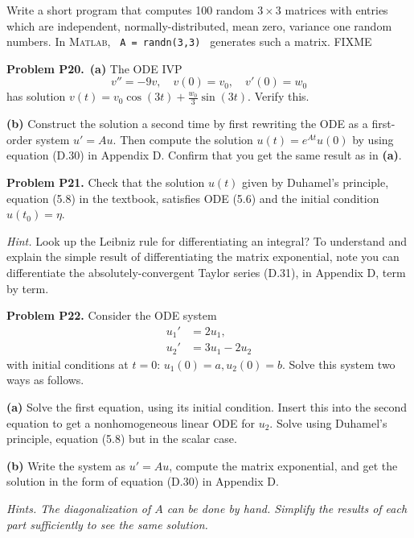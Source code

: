 \documentclass[12pt]{amsart}
\newcommand{\Matlab}{\textsc{Matlab}\xspace}
\newcommand{\prob}[1]{\bigskip\noindent\textbf{#1}\quad }
\newcommand{\epart}[1]{\medskip\noindent\textbf{(#1)}\quad }
\newcommand{\ppart}[1]{\,\textbf{(#1)}\quad }
\begin{document}
\medskip \noindent
Write a short program that computes 100 random $3\times 3$ matrices with entries which are independent, normally-distributed, mean zero, variance one random numbers.  In \Matlab, \verb| A = randn(3,3) | generates such a matrix.  FIXME


\prob{Problem P20.}  \ppart{a} The ODE IVP
    $$v'' = - 9 v, \quad v(0) = v_0, \quad v'(0) = w_0$$
has solution $v(t) = v_0 \cos(3 t) + \frac{w_0}{3} \sin(3t)$.  Verify this.

\epart{b}  Construct the solution a second time by first rewriting the ODE as a first-order system $u' = A u$.  Then compute the solution $u(t) = e^{At} u(0)$ by using equation (D.30) in Appendix D.  Confirm that you get the same result as in \textbf{(a)}.


\prob{Problem P21.}  Check that the solution $u(t)$ given by Duhamel's principle, equation (5.8) in the textbook, satisfies ODE (5.6) and the initial condition $u(t_0)=\eta$.

\medskip
\noindent \emph{Hint.}  Look up the Leibniz rule for differentiating an integral?  To understand and explain the simple result of differentiating the matrix exponential, note you can differentiate the absolutely-convergent Taylor series (D.31), in Appendix D, term by term.


\prob{Problem P22.}  Consider the ODE system
\begin{align*}
u_1' &= 2 u_1, \\
u_2' &= 3 u_1 - 2 u_2
\end{align*}
with initial conditions at $t=0$: $u_1(0) = a, u_2(0) = b$.  Solve this system two ways as follows.

\epart{a} Solve the first equation, using its initial condition.  Insert this into the second equation to get a nonhomogeneous linear ODE for $u_2$.  Solve using Duhamel's principle, equation (5.8) but in the scalar case.

\epart{b} Write the system as $u'=Au$, compute the matrix exponential, and get the solution in the form of equation (D.30) in Appendix D.

\medskip
\noindent \emph{Hints. The diagonalization of $A$ can be done by hand.  Simplify the results of each part sufficiently to see the same solution.}
\end{document}

